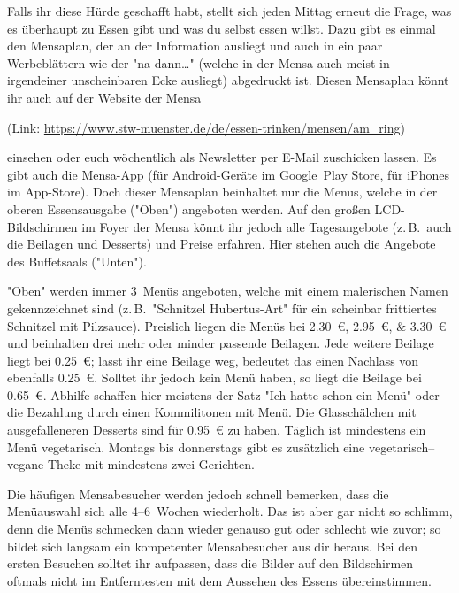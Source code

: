\begin{multicols*}{2}
Falls ihr diese Hürde geschafft habt, stellt sich jeden Mittag erneut die Frage, was es überhaupt zu Essen gibt und was du selbst essen willst.
Dazu gibt es einmal den Mensaplan, der an der Information ausliegt und auch in ein paar Werbeblättern wie der "na dann\dots" (welche in der Mensa auch meist in irgendeiner unscheinbaren Ecke ausliegt) abgedruckt ist.
Diesen Mensaplan könnt ihr auch auf der Website der Mensa

(Link: \url{https://www.stw-muenster.de/de/essen-trinken/mensen/am_ring})

einsehen oder euch wöchentlich als Newsletter per E-Mail zuschicken lassen.
Es gibt auch die Mensa-App (für Android-Geräte im Google~Play Store, für iPhones im App-Store).
Doch dieser Mensaplan beinhaltet nur die Menus, welche in der oberen Essensausgabe ("Oben") angeboten werden.
Auf den großen LCD-Bildschirmen im Foyer der Mensa könnt ihr jedoch alle Tagesangebote (z.\,B.\ auch die Beilagen und Desserts) und Preise erfahren.
Hier stehen auch die Angebote des Buffetsaals ("Unten").

"Oben" werden immer 3~Menüs angeboten, welche mit einem malerischen Namen gekennzeichnet sind (z.\,B.\ "Schnitzel Hubertus-Art" für ein scheinbar frittiertes Schnitzel mit Pilzsauce).
Preislich liegen die Menüs bei \SIlist{2,30; 2,95; 3,30}{\euro} und beinhalten drei mehr oder minder passende Beilagen.
Jede weitere Beilage liegt bei \SI{0,25}{\euro}; lasst ihr eine Beilage weg, bedeutet das einen Nachlass von ebenfalls \SI{0,25}{\euro}.
Solltet ihr jedoch kein Menü haben, so liegt die Beilage bei \SI{0,65}{\euro}.
Abhilfe schaffen hier meistens der Satz "Ich hatte schon ein Menü" oder die Bezahlung durch einen Kommilitonen mit Menü.
Die Glasschälchen mit ausgefalleneren Desserts sind für \SI{0,95}{\euro} zu haben.
Täglich ist mindestens ein Menü vegetarisch.
Montags bis donnerstags gibt es zusätzlich eine vegetarisch--vegane Theke mit mindestens zwei Gerichten.

Die häufigen Mensabesucher werden jedoch schnell bemerken, dass die Menüauswahl sich alle 4--6~Wochen wiederholt.
Das ist aber gar nicht so schlimm, denn die Menüs schmecken dann wieder genauso gut oder schlecht wie zuvor; so bildet sich langsam ein kompetenter Mensabesucher aus dir heraus.
Bei den ersten Besuchen solltet ihr aufpassen, dass die Bilder auf den Bildschirmen oftmals nicht im Entferntesten mit dem Aussehen des Essens übereinstimmen.


\end{multicols*}
